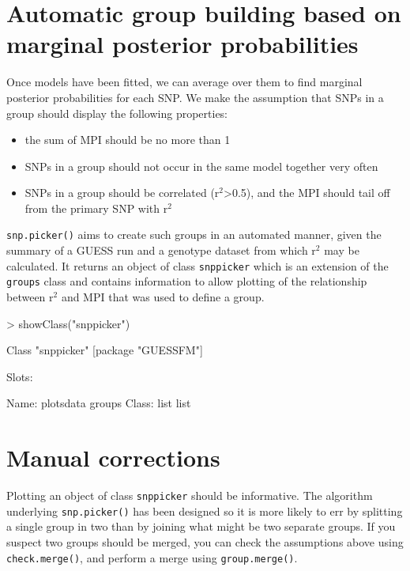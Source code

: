 \documentclass[11pt]{article}
\begin{document}
\section{Automatic group building based on marginal posterior probabilities}
\label{sec-3}
Once models have been fitted, we can average over them to find
marginal posterior probabilities for each SNP.  We make the assumption
that SNPs in a group should display the following properties:
\begin{itemize}
\item the sum of MPI should be no more than 1
\item SNPs in a group should not occur in the same model together very
often
\item SNPs in a group should be correlated (r$^{\text{2}}$>0.5), and the MPI should tail
off from the primary SNP with r$^{\text{2}}$
\end{itemize}

\texttt{snp.picker()} aims to create such groups in an automated manner,
given the summary of a GUESS run and a genotype dataset from which r$^{\text{2}}$
may be calculated.  It returns an object of class \texttt{snppicker} which is
an extension of the \texttt{groups} class and contains information to allow
plotting of the relationship between r$^{\text{2}}$ and MPI that was used to
define a group.

\begin{Schunk}
\begin{Sinput}
> showClass("snppicker")
\end{Sinput}
\begin{Soutput}
Class "snppicker" [package "GUESSFM"]

Slots:
                          
Name:  plotsdata    groups
Class:      list      list
\end{Soutput}
\end{Schunk}

\section{Manual corrections}
\label{sec-4}
Plotting an object of class \texttt{snppicker} should be informative.  The
algorithm underlying \texttt{snp.picker()} has been designed so it is more
likely to err by splitting a single group in two than by joining what
might be two separate groups.  If you suspect two groups should be
merged, you can check the assumptions above using \texttt{check.merge()}, and
perform a merge using \texttt{group.merge()}.
\end{document}
